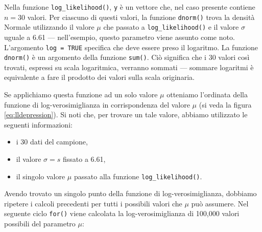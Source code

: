 \documentclass[
  11pt,
]{krantz}
\makeatletter
\newenvironment{Shaded}{\begin{snugshade}}{\end{snugshade}}
\newcommand{\AttributeTok}[1]{\textcolor[rgb]{0.61,0.61,0.61}{#1}}
\newcommand{\ConstantTok}[1]{\textcolor[rgb]{0,0,0}{#1}}
\newcommand{\ControlFlowTok}[1]{\textcolor[rgb]{0.27,0.27,0.27}{\textbf{#1}}}
\newcommand{\DecValTok}[1]{\textcolor[rgb]{0.06,0.06,0.06}{#1}}
\newcommand{\FloatTok}[1]{\textcolor[rgb]{0.06,0.06,0.06}{#1}}
\newcommand{\FunctionTok}[1]{\textcolor[rgb]{0,0,0}{#1}}
\newcommand{\NormalTok}[1]{#1}
\newcommand{\OtherTok}[1]{\textcolor[rgb]{0.37,0.37,0.37}{#1}}
\newcommand{\SpecialCharTok}[1]{\textcolor[rgb]{0,0,0}{#1}}
\providecommand{\tightlist}{%
  \setlength{\itemsep}{0pt}\setlength{\parskip}{0pt}}
\newenvironment{kframe}{%
\medskip{}
\setlength{\fboxsep}{.8em}
 \def\at@end@of@kframe{}%
 \ifinner\ifhmode%
  \def\at@end@of@kframe{\end{minipage}}%
  \begin{minipage}{\columnwidth}%
 \fi\fi%
 \def\FrameCommand##1{\hskip\@totalleftmargin \hskip-\fboxsep
 \colorbox{shadecolor}{##1}\hskip-\fboxsep
     \hskip-\linewidth \hskip-\@totalleftmargin \hskip\columnwidth}%
 \MakeFramed {\advance\hsize-\width
   \@totalleftmargin\z@ \linewidth\hsize
   \@setminipage}}%
 {\par\unskip\endMakeFramed%
 \at@end@of@kframe}
\renewenvironment{Shaded}{\begin{kframe}}{\end{kframe}}
\theoremstyle{definition}
\theoremstyle{definition}
\theoremstyle{definition}
\theoremstyle{definition}
\theoremstyle{remark}
\makeatother
\begin{document}
Nella funzione \texttt{log\_likelihood()}, \texttt{y} è un vettore che, nel caso presente contiene \(n = 30\) valori. Per ciascuno di questi valori, la funzione \texttt{dnorm()} trova la densità Normale utilizzando il valore \(\mu\) che passato a \texttt{log\_likelihood()} e il valore \(\sigma\) uguale a 6.61 --- nell'esempio, questo parametro viene assunto come noto. L'argomento \texttt{log\ =\ TRUE} specifica che deve essere preso il logaritmo. La funzione \texttt{dnorm()} è un argomento della funzione \texttt{sum()}. Ciò significa che i 30 valori così trovati, espressi su scala logaritmica, verranno sommati --- sommare logaritmi è equivalente a fare il prodotto dei valori sulla scala originaria.

Se applichiamo questa funzione ad un solo valore \(\mu\) otteniamo l'ordinata della funzione di log-verosimiglianza in corrispondenza del valore \(\mu\) (si veda la figura \eqref{eq:lldepression}). Si noti che, per trovare un tale valore, abbiamo utilizzato le seguenti informazioni:

\begin{itemize}
\tightlist
\item
  i 30 dati del campione,
\item
  il valore \(\sigma = s\) fissato a 6.61,
\item
  il singolo valore \(\mu\) passato alla funzione \texttt{log\_likelihood()}.
\end{itemize}

Avendo trovato un singolo punto della funzione di log-verosimiglianza, dobbiamo ripetere i calcoli precedenti per tutti i possibili valori che \(\mu\) può assumere. Nel seguente ciclo \texttt{for()} viene calcolata la log-verosimiglianza di 100,000 valori possibili del parametro \(\mu\):

\begin{Shaded}
\end{Shaded}
\end{document}
